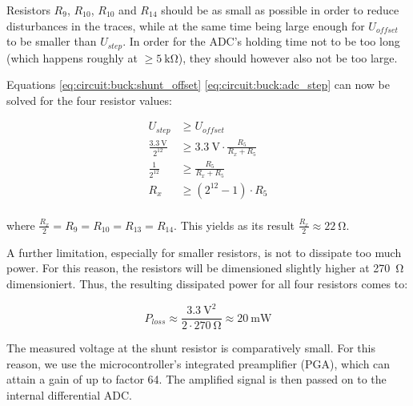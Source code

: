 Resistors  $R_9$, $R_{10}$, $R_{10}$ and  $R_{14}$  should be as small as possible%
in order to  reduce disturbances in the  traces, while at the  same time being
large enough for $U_{offset}$ to be  smaller than $U_{step}$. In order for the
ADC's  holding  time not  to  be  too long  (which  happens  roughly at  $\geq      %
\SI{5}{\kilo\ohm}$), they should however also not be too large.

Equations \ref{eq:circuit:buck:shunt_offset} \ref{eq:circuit:buck:adc_step} can now
be solved for the four resistor values:

\begin{align*}
                          U_{step} &\geq U_{offset} \\
    \frac{\SI{3.3}{\volt}}{2^{12}} &\geq \SI{3.3}{\volt} \cdot \frac{R_5}{R_x + R_5} \\
                  \frac{1}{2^{12}} &\geq \frac{R_5}{R_x + R_5} \\
                               R_x &\geq \left( 2^{12} - 1 \right) \cdot R_5 \\
\end{align*}

where $\frac{R_x}{2} =  R_{9} = R_{10} = R_{13} =  R_{14}$. This yields as its
result $\frac{R_x}{2} \approx \SI{22}{\ohm}$.

A further limitation, especially for smaller resistors, is not to dissipate too much
power. For this reason, the resistors will be dimensioned slightly higher at %
\SI{270}{\ohm}  dimensioniert. Thus, the  resulting dissipated  power for  all
four resistors comes to:

\begin{equation*}
    P_{loss} \approx \frac{\SI{3.3}{\volt}^2}{2\cdot \SI{270}{\ohm}} \approx \SI{20}{\milli\watt}
\end{equation*}

The measured  voltage at the  shunt resistor is comparatively  small. For this reason,
we use the microcontroller's integrated preamplifier (PGA), %
which can  attain a  gain of  up to  factor 64. The  amplified signal  is then
passed on to the internal differential ADC.

